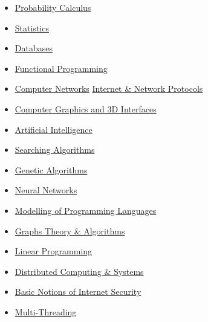 \documentclass[10pt,a4paper,academicons]{altacv}
\begin{document}
{\begin{itemize}
\item \hspace{0.5em} \href{https://en.wikipedia.org/wiki/Probability}{Probability Calculus}
\item \hspace{0.5em} \href{https://en.wikipedia.org/wiki/Statistics}{Statistics}
\item \hspace{0.5em} \href{https://en.wikipedia.org/wiki/Database}{Databases}
\item \hspace{0.5em} \href{https://en.wikipedia.org/wiki/Functional_programming}{Functional Programming}
\item \hspace{0.5em} \href{https://en.wikipedia.org/wiki/Computer_network}{Computer Networks}
\href{https://en.wikipedia.org/wiki/Internet_Protocol}{Internet \& Network Protocols}
\item \hspace{0.5em} \href{https://en.wikipedia.org/wiki/Computer_graphics}{Computer Graphics and 3D Interfaces}
\item \hspace{0.5em} \href{https://en.wikipedia.org/wiki/Artificial_intelligence}{Artificial Intelligence}
\item \hspace{0.5em} \href{https://en.wikipedia.org/wiki/Search_algorithm}{Searching Algorithms}
\item \hspace{0.5em} \href{https://en.wikipedia.org/wiki/Genetic_algorithm}{Genetic Algorithms}
\item \hspace{0.5em} \href{https://en.wikipedia.org/wiki/Neural_network}{Neural Networks}
\item \hspace{0.5em} \href{https://en.wikipedia.org/wiki/Modeling_language}{Modelling of Programming Languages}
\item \hspace{0.5em} \href{https://en.wikipedia.org/wiki/Graph_theory}{Graphs Theory \& Algorithms}
\item \hspace{0.5em} \href{https://en.wikipedia.org/wiki/Linear_programming}{Linear Programming}
\item \hspace{0.5em} \href{https://en.wikipedia.org/wiki/Distributed_computing}{Distributed Computing \& Systems}
\item \hspace{0.5em} \href{https://en.wikipedia.org/wiki/Internet_security}{Basic Notions of Internet Security}
\item \hspace{0.5em} \href{https://en.wikipedia.org/wiki/Multithreading_(computer_architecture)}{Multi-Threading}
\end{itemize}
}\\
\end{document}
